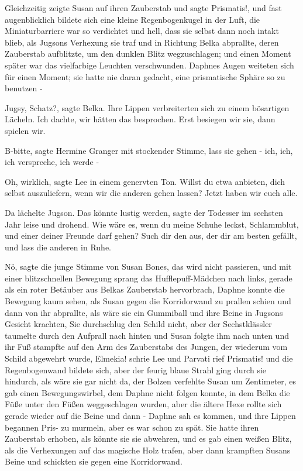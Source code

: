 Gleichzeitig zeigte Susan auf ihren Zauberstab und sagte \glqq{}
Prismatis!\grqq{}, und fast augenblicklich bildete sich eine kleine
Regenbogenkugel in der Luft, die Miniaturbarriere war so verdichtet und hell,
dass sie selbst dann noch intakt blieb, als Jugsons Verhexung sie traf und in
Richtung Belka abprallte, deren Zauberstab aufblitzte, um den dunklen Blitz
wegzuschlagen; und einen Moment später war das vielfarbige Leuchten
verschwunden. Daphnes Augen weiteten sich für einen Moment; sie hatte nie daran
gedacht, eine prismatische Sphäre so zu benutzen -

\glqq{}Jugsy, Schatz?\grqq{}, sagte Belka. Ihre Lippen verbreiterten sich zu
einem bösartigen Lächeln. \glqq{}Ich dachte, wir hätten das besprochen. Erst
besiegen wir sie, dann spielen wir.\grqq{}

\glqq{}B-bitte\grqq{}, sagte Hermine Granger mit stockender Stimme, \glqq{}lass
sie gehen - ich, ich, ich verspreche, ich werde -\grqq{}

\glqq{}Oh, wirklich\grqq{}, sagte Lee in einem genervten Ton. \glqq{}Willst du
etwa anbieten, dich selbst auszuliefern, wenn wir die anderen gehen lassen?
Jetzt haben wir euch alle.\grqq{}

Da lächelte Jugson. \glqq{}Das könnte lustig werden\grqq{}, sagte der Todesser im
sechsten Jahr leise und drohend. \glqq{}Wie wäre es, wenn du meine Schuhe leckst,
Schlammblut, und einer deiner Freunde darf gehen? Such dir den aus, der dir am
besten gefällt, und lass die anderen in Ruhe.\grqq{}

\glqq{}Nö\grqq{}, sagte die junge Stimme von Susan Bones, \glqq{}das wird nicht
passieren\grqq{}, und mit einer blitzschnellen Bewegung sprang das
Hufflepuff-Mädchen nach links, gerade als ein roter Betäuber aus Belkas
Zauberstab hervorbrach, Daphne konnte die Bewegung kaum sehen, als Susan gegen
die Korridorwand zu prallen schien und dann von ihr abprallte, als wäre sie ein
Gummiball und ihre Beine in Jugsons Gesicht krachten, Sie durchschlug den Schild
nicht, aber der Sechstklässler taumelte durch den Aufprall nach hinten und Susan
folgte ihm nach unten und ihr Fuß stampfte auf den Arm des Zauberstabs des
Jungen, der wiederum vom Schild abgewehrt wurde, \glqq{}Elmekia! \glqq{} schrie
Lee und Parvati rief \glqq{}Prismatis! \glqq{} und die Regenbogenwand bildete
sich, aber der feurig blaue Strahl ging durch sie hindurch, als wäre sie gar
nicht da, der Bolzen verfehlte Susan um Zentimeter, es gab einen
Bewegungswirbel, dem Daphne nicht folgen konnte, in dem Belka die Füße unter den
Füßen weggeschlagen wurden, aber die ältere Hexe rollte sich gerade wieder auf
die Beine und dann - Daphne sah es kommen, und ihre Lippen begannen \glqq{}
Pris-\grqq{} zu murmeln, aber es war schon zu spät. Sie hatte ihren Zauberstab
erhoben, als könnte sie sie abwehren, und es gab einen weißen Blitz, als die
Verhexungen auf das magische Holz trafen, aber dann krampften Susans Beine und
schickten sie gegen eine Korridorwand.

